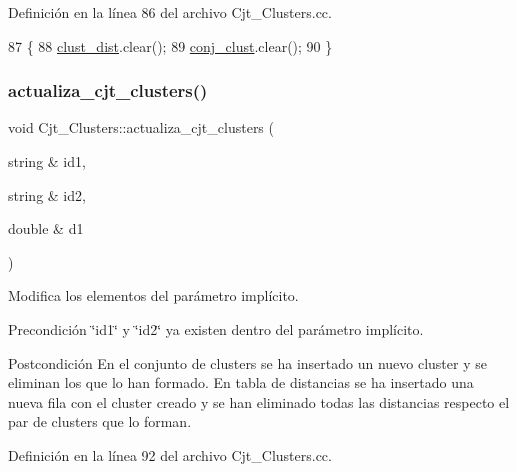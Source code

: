 Definición en la línea 86 del archivo Cjt\+\_\+\+Clusters.\+cc.


\begin{DoxyCode}
87 \{
88     \hyperlink{class_cjt___clusters_a2e0931084578a4abb26d17bf289628d2}{clust\_dist}.clear();
89     \hyperlink{class_cjt___clusters_a1202e93aafa953b2dc9a76d03f056b08}{conj\_clust}.clear();
90 \}
\end{DoxyCode}
\mbox{\label{class_cjt___clusters_a423d4312a548689125a245f32f4a87b5}} 
\subsubsection{\texorpdfstring{actualiza\+\_\+cjt\+\_\+clusters()}{actualiza\_cjt\_clusters()}}
{\footnotesize\ttfamily void Cjt\+\_\+\+Clusters\+::actualiza\+\_\+cjt\+\_\+clusters (\begin{DoxyParamCaption}\item[{string \&}]{id1,  }\item[{string \&}]{id2,  }\item[{double \&}]{d1 }\end{DoxyParamCaption})}



Modifica los elementos del parámetro implícito. 

\begin{DoxyPrecond}{Precondición}
\char`\"{}id1\char`\"{} y \char`\"{}id2\char`\"{} ya existen dentro del parámetro implícito. 
\end{DoxyPrecond}
\begin{DoxyPostcond}{Postcondición}
En el conjunto de clusters se ha insertado un nuevo cluster y se eliminan los que lo han formado. En tabla de distancias se ha insertado una nueva fila con el cluster creado y se han eliminado todas las distancias respecto el par de clusters que lo forman. 
\end{DoxyPostcond}


Definición en la línea 92 del archivo Cjt\+\_\+\+Clusters.\+cc.


